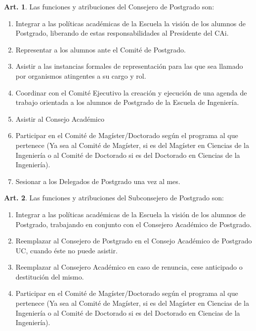 \documentclass[letterpaper,11pt]{article}
\theoremstyle{definition}%
\newtheorem{art}{Art.} %
\begin{document}
\begin{art}\label{funcionesCAPostgrado}
	Las funciones y atribuciones del Consejero de Postgrado son:
	\begin{enumerate}
		\item Integrar a las políticas académicas de la Escuela la visión de los alumnos de Postgrado, liberando de estas responsabilidades al Presidente del CAi.
		\item Representar a los alumnos ante el Comité de Postgrado.
		\item Asistir a las instancias formales de representación para las que sea llamado por organismos atingentes a su cargo y rol.
		\item Coordinar con el Comité Ejecutivo la creación y ejecución de una agenda de trabajo orientada a los alumnos de Postgrado de la Escuela de Ingeniería.
		\item Asistir al Consejo Académico
		\item Participar en el Comité de Magíster/Doctorado según el programa al que pertenece (Ya sea al Comité de Magíster, si es del Magíster en Ciencias de la Ingeniería o al Comité de Doctorado si es del Doctorado en Ciencias de la Ingeniería).
		\item Sesionar a los Delegados de Postgrado una vez al mes.
	\end{enumerate}
\end{art}

\begin{art}
	Las funciones y atribuciones del Subconsejero de Postgrado son:
	\begin{enumerate}
		\item Integrar a las políticas académicas de la Escuela la visión de los alumnos de Postgrado, trabajando en conjunto con el Consejero Académico de Postgrado.
		\item Reemplazar al Consejero de Postgrado en el Consejo Académico de Postgrado UC, cuando éste no puede asistir.
		\item Reemplazar al Consejero Académico en caso de renuncia, cese anticipado o destitución del mismo.
		\item Participar en el Comité de Magíster/Doctorado según el programa al que pertenece (Ya sea al Comité de Magíster, si es del Magíster en Ciencias de la Ingeniería o al Comité de Doctorado si es del Doctorado en Ciencias de la Ingeniería).
	\end{enumerate}
\end{art}
\end{document}

